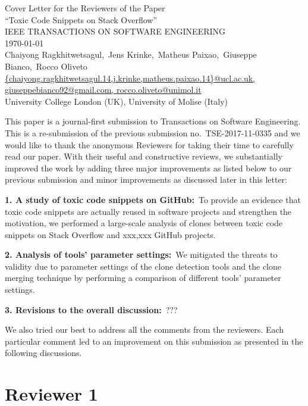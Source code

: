 \documentclass[a4paper,twoside,10pt]{reviewresponse}
\makeatletter
\newcommand{\myAuthors}{Chaiyong Ragkhitwetsagul,~Jens Krinke,~Matheus Paixao,~Giuseppe Bianco,~Rocco Oliveto}
\newcommand{\myEmail}{{chaiyong.ragkhitwetsagul.14,j.krinke,matheus.paixao.14}@ucl.ac.uk, giuseppebianco92@gmail.com, rocco.oliveto@unimol.it}
\newcommand{\myTitle}{Cover Letter for the Reviewers of the Paper \\ ``Toxic Code Snippets on Stack Overflow''}
\newcommand{\myJournal}{IEEE TRANSACTIONS ON SOFTWARE ENGINEERING}
\newcommand{\myDept}{University College London (UK), University of Molise (Italy)}
\makeatother
\begin{document}
\thispagestyle{plain}

\begin{center}
 {\LARGE\myTitle} \vspace{0.3cm} \\
 {\large\myJournal} \vspace{0.3cm} \\
 \today \vspace{0.3cm} \\
 \myAuthors \\
 \url{\myEmail} \\
 \vspace{0.3cm} 
 \myDept \vspace{1cm}
\end{center}


This paper is a journal-first submission to Transactions on Software Engineering. 
This is a re-submission of the previous submission no.~TSE-2017-11-0335 and we would like to thank the anonymous Reviewers for taking their time to carefully read our paper. With their useful and constructive reviews, we substantially improved the work by adding three major improvements as listed below to our previous submission and minor improvements as discussed later in this letter:

\textbf{1. A study of toxic code snippets on GitHub:}~To provide an evidence that toxic code snippets are actually reused in software projects and strengthen the motivation, we performed a large-scale analysis of clones between toxic code snippets on Stack Overflow and xxx,xxx GitHub projects.

\textbf{2. Analysis of tools' parameter settings:}~We mitigated the threats to validity due to parameter settings of the clone detection tools and the clone merging technique by performing a comparison of different tools' parameter settings.

\textbf{3. Revisions to the overall discussion:}~???

We also tried our best to address all the comments from the reviewers. Each particular comment led to an improvement on this submission as presented in the following discussions.

\clearpage

\section{Reviewer 1}
\end{document}
